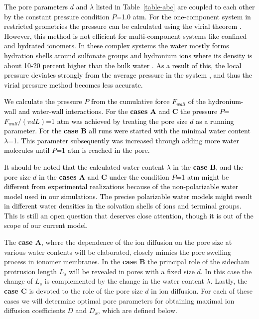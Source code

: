 \documentclass[3p,english,preprint]{elsarticle}
\newcommand{\need}[1]{\textcolor{black}{#1}}
\newcommand{\mage}[1]{\textcolor{black}{#1}}
\begin{document}
{\need{
The pore parameters  $d$ and  $\lambda$ listed in Table~\ref{table-abc} are coupled 
to each other by the constant pressure condition $P$=1.0 atm. For  the 
one-component system in restricted geometries the pressure can 
be calculated using the virial theorem \cite{kumar-2005,kumar-2007}. However, 
this method is not efficient for multi-component systems like confined and hydrated ionomers. 
 In these complex systems  the water mostly forms hydration shells around sulfonate groups and hydronium ions 
where its density 
is about  10-20 percent higher  than the bulk water \cite{medasani-2014}. 
As a result of this, the local pressure  deviates strongly from the average pressure in the system \cite{chialvo-1999}, 
and thus the virial pressure method becomes less accurate.  
}}

{\need{ 
We calculate the pressure $P$ from the cumulative force  $F_{wall}$ of the 
hydronium-wall and water-wall interactions. For the {\bf cases A} and {\bf C}
the pressure $P$=$ F_{wall}/(\pi d L)$=1 atm was achieved by treating 
the pore size $d$ as a running parameter.  
For the {\bf case B} all runs were started with the minimal water content $\lambda$=1. 
This parameter subsequently was increased through adding more water molecules until 
 $P$=1 atm is reached in the pore. 
}}

{\need{
It should be noted that the calculated water content $\lambda$ in the
{\bf case B}, and  the pore size $d$ in  the {\bf cases A} and {\bf C} 
under the condition $P$=1 atm might be different from 
experimental realizations  because of the non-polarizable water model used 
in our simulations. The precise polarizable water models \cite{walbran-2001}  
might result in different water densities in the solvation shells of ions and terminal groups. 
This  is still an open question that deserves close attention, 
though it is out of the scope of our current model. 
}}













 The {\bf case A}, where the dependence of the 
ion diffusion on the pore size at various water contents will
be elaborated, closely  mimics the  pore swelling  process in ionomer membranes.
In the {\bf case B} the principal role of the sidechain protrusion length $L_s$ 
will be revealed in pores with a fixed size $d$. In this case the change of $L_s$ 
is complemented by  the change in the water content $\lambda$. Lastly, 
the {\bf case C} is devoted to the role of the pore size $d$ in ion diffusion. 
For each of these cases we will determine optimal pore parameters 
for obtaining  maximal ion diffusion coefficients $D$  and $D_x$, which are defined below. 
\end{document}
